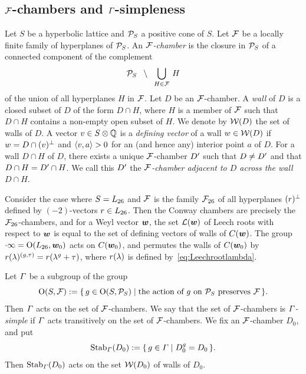 \documentclass{amsart} %
\begin{document}
\subsection{$\mathord{\mathcal{F}}$-chambers and $\varGamma$-simpleness}\label{subsec:FFF}
%
%
Let $S$ be a hyperbolic lattice
and $\mathord{\mathcal{P}}_S$ a positive cone of $S$.
Let $\mathord{\mathcal{F}}$ be a locally finite family of hyperplanes of $\mathord{\mathcal{P}}_S$.
An \emph{$\mathord{\mathcal{F}}$-chamber} is  the closure in $\mathord{\mathcal{P}}_S$ of a connected component 
of the complement
\[
\mathord{\mathcal{P}}_S\;\;\setminus \;\; \bigcup_{H\in \mathord{\mathcal{F}}}\, H
\]
of the union of all hyperplanes $H$ in $\mathord{\mathcal{F}}$.
Let $D$ be an $\mathord{\mathcal{F}}$-chamber.
A \emph{wall} of $D$ is a closed subset of $D$
of the form $D\cap H$,  where $H$ is a member of $\mathord{\mathcal{F}}$
such that $D\cap H$ contains a non-empty open subset of $H$.
We denote by $\mathord{\mathcal{W}}(D)$ the set of walls of $D$.
A vector $v\in S\otimes\mathord{\mathbb{Q}}$ is a \emph{defining vector} of a wall $w\in \mathord{\mathcal{W}}(D)$ 
if $w=D\cap (v)^{\perp}$ and $\langle v, a \rangle>0$ for an (and hence any) interior point $a$ of $D$.
For a wall $D\cap H$ of $D$,
there exists a unique $\mathord{\mathcal{F}}$-chamber $D^{\prime}$
such that $D\ne D^{\prime}$ and that $D\cap H=D^{\prime}\cap H$.
We call this $D^{\prime}$ the \emph{$\mathord{\mathcal{F}}$-chamber adjacent to $D$ across the wall $D\cap H$}.
%
\begin{example}
Consider the case where $S=L_{26}$ and $\mathord{\mathcal{F}}$ is the family ${\mathord{\mathcal{F}}}_{26}$ of all hyperplanes $(r)^{\perp}$
defined  by $(-2)$-vectors $r\in L_{26}$.
Then the Conway chambers are precisely  the  ${\mathord{\mathcal{F}}}_{26}$-chambers,
and for a Weyl vector $\boldsymbol{w}$,
the set $\mathord{\mathcal{L}}(\boldsymbol{w})$ of  Leech roots with respect to $\boldsymbol{w}$ is equal to 
the set of 
defining vectors of walls of  $\mathord{C}(\boldsymbol{w})$.
The group $\cdot \infty=\mathord{\mathrm{O}}(L_{26}, \boldsymbol{w}_0)$ 
acts on $\mathord{C}(\boldsymbol{w}_0)$, and 
 permutes 
the  walls of $\mathord{C}(\boldsymbol{w}_0)$ by
$r(\lambda)^{(g, \tau)}=r(\lambda^g+\tau)$,
where $r(\lambda)$ is %
defined by~\eqref{eq:Leechrootlambda}.
\end{example}
%
Let $\varGamma$ be a subgroup
of the group 
\[
\mathord{\mathrm{O}}(S, \mathord{\mathcal{F}}):=\{\,{g\in \mathord{\mathrm{O}}(S, \mathord{\mathcal{P}}_S)}\mid {\textrm{the action of $g$ on $\mathord{\mathcal{P}}_S$ preserves $\mathord{\mathcal{F}}$}} \,\}.
\]
%
%
Then $\varGamma$ acts on the set of $\mathord{\mathcal{F}}$-chambers.
We say that the set of $\mathord{\mathcal{F}}$-chambers is \emph{$\varGamma$-simple}
if $\varGamma$ acts transitively on the set of  $\mathord{\mathcal{F}}$-chambers.
We fix an $\mathord{\mathcal{F}}$-chamber $D_0$, and put
\[
\operatorname{Stab}_{\varGamma}(D_0):=\{\,{g\in \varGamma}\mid {D_0^g=D_0} \,\}.
\]
Then $\operatorname{Stab}_{\varGamma}(D_0)$ acts on the set $\mathord{\mathcal{W}}(D_0)$ of walls of $D_0$.
\end{document}
